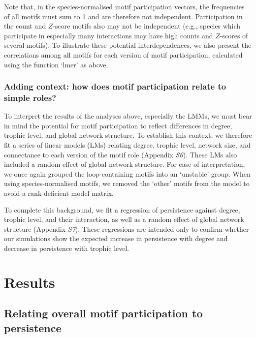 \documentclass[12pt]{article}
\begin{document}
\begin{spacing}{2.0}
                
                Note that, in the species-normalised motif participation vectors, the frequencies of all motifs must sum to 1 and are therefore not independent. 
                Participation in the count and $Z$-score motifs also may not be independent (e.g., species which participate in especially many interactions may have high counts and $Z$-scores of several motifs).
                To illustrate these potential interdependences, we also present the correlations among all motifs for each version of motif participation, calculated using the function `lmer' as above.
                

        \subsubsection*{Adding context: how does motif participation relate to simple roles?}

            To interpret the results of the analyses above, especially the LMMs, we must bear in mind the potential for motif participation to reflect differences in degree, trophic level, and global network structure. 
            To establish this context, we therefore fit a series of linear models (LMs) relating degree, trophic level, network size, and connectance to each version of the motif role (Appendix \emph{S6}). 
            These LMs also included a random effect of global network structure.
            For ease of interpretation, we once again grouped the loop-containing motifs into an `unstable' group. 
            When using species-normalised motifs, we removed the `other' motifs from the model to avoid a rank-deficient model matrix.
            
            
            To complete this background, we fit a regression of persistence against degree, trophic level, and their interaction, as well as a random effect of global network structure (Appendix \emph{S7}). 
            These regressions are intended only to confirm whether our simulations show the expected increase in persistence with degree and decrease in persistence with trophic level. 


\section*{Results}
	
    \subsection*{Relating overall motif participation to persistence}
    

\end{spacing}
\end{document}
